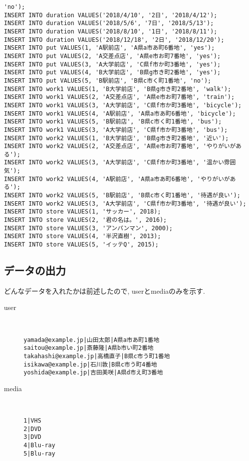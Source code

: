 \documentclass{jarticle}
\begin{document}
\begin{verbatim}
'no');
INSERT INTO duration VALUES('2018/4/10', '2日', '2018/4/12');
INSERT INTO duration VALUES('2018/5/6', '7日', '2018/5/13');
INSERT INTO duration VALUES('2018/8/10', '1日', '2018/8/11');
INSERT INTO duration VALUES('2018/12/18', '2日', '2018/12/20');
INSERT INTO put VALUES(1, 'A駅前店', 'A県a市あ町6番地', 'yes');
INSERT INTO put VALUES(2, 'A交差点店', 'A県e市お町7番地', 'yes');
INSERT INTO put VALUES(3, 'A大学前店', 'C県f市か町3番地', 'yes');
INSERT INTO put VALUES(4, 'B大学前店', 'B県g市き町2番地', 'yes');
INSERT INTO put VALUES(5, 'B駅前店', 'B県c市く町1番地', 'no');
INSERT INTO work1 VALUES(1, 'B大学前店', 'B県g市き町2番地', 'walk');
INSERT INTO work1 VALUES(2, 'A交差点店', 'A県e市お町7番地', 'train');
INSERT INTO work1 VALUES(3, 'A大学前店', 'C県f市か町3番地', 'bicycle');
INSERT INTO work1 VALUES(4, 'A駅前店', 'A県a市あ町6番地', 'bicycle');
INSERT INTO work1 VALUES(5, 'B駅前店', 'B県c市く町1番地', 'bus');
INSERT INTO work1 VALUES(3, 'A大学前店', 'C県f市か町3番地', 'bus');
INSERT INTO work2 VALUES(1, 'B大学前店', 'B県g市き町2番地', '近い');
INSERT INTO work2 VALUES(2, 'A交差点店', 'A県e市お町7番地', 'やりがいがある');
INSERT INTO work2 VALUES(3, 'A大学前店', 'C県f市か町3番地', '温かい雰囲気');
INSERT INTO work2 VALUES(4, 'A駅前店', 'A県a市あ町6番地', 'やりがいがある');
INSERT INTO work2 VALUES(5, 'B駅前店', 'B県c市く町1番地', '待遇が良い');
INSERT INTO work2 VALUES(3, 'A大学前店', 'C県f市か町3番地', '待遇が良い');
INSERT INTO store VALUES(1, 'サッカー', 2018);
INSERT INTO store VALUES(2, '君の名は。', 2016);
INSERT INTO store VALUES(3, 'アンパンマン', 2000);
INSERT INTO store VALUES(4, '半沢直樹', 2013);
INSERT INTO store VALUES(5, 'イッテQ', 2015);
\end{verbatim}
\subsection{データの出力}
どんなデータを入れたかは前述したので, userとmediaのみを示す.
\begin{description}
\item[user] \leavevmode \\
\begin{verbatim}
yamada@example.jp|山田太郎|A県a市あ町1番地
saitou@example.jp|斎藤隆|A県b市い町2番地
takahashi@example.jp|高橋直子|B県c市う町1番地
isikawa@example.jp|石川敦|B県c市う町4番地
yoshida@example.jp|吉田美咲|A県d市え町3番地
\end{verbatim}
\item[media] \leavevmode \\
\begin{verbatim}
1|VHS
2|DVD
3|DVD
4|Blu-ray
5|Blu-ray
\end{verbatim}
\end{description}
\end{document}
